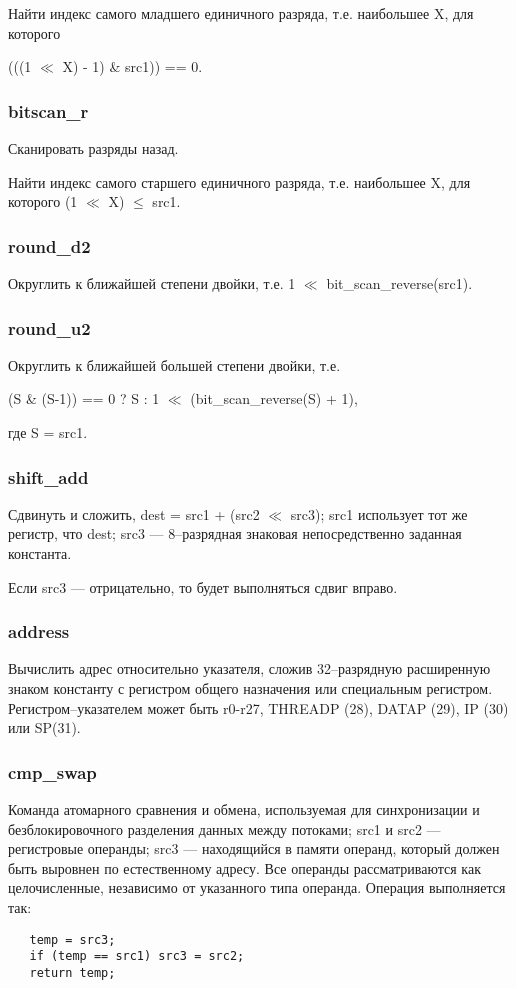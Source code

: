 \documentclass[forwardcom.tex]{subfiles}
\begin{document}
Найти индекс самого младшего единичного разряда, т.е. наибольшее  X, для которого

(((1 $\ll$ X) - 1) \& src1)) == 0.

\subsubsection{bitscan\_r}
Сканировать разряды назад.

Найти индекс самого старшего единичного разряда, т.е. наибольшее  X, для которого (1 $\ll$ X) $\leq$ src1.

\subsubsection{round\_d2}
Округлить к ближайшей степени двойки, т.е. 1 $\ll$ bit\_scan\_reverse(src1).

\subsubsection{round\_u2}
Округлить к ближайшей большей степени двойки, т.е.

(S \& (S-1)) == 0 ? S : 1 $\ll$  (bit\_scan\_reverse(S) + 1),

где S = src1.

\subsubsection{shift\_add}
Сдвинуть и сложить, dest = src1 + (src2 $\ll$  src3); src1 использует тот же регистр, что dest; src3 --- 8--разрядная знаковая непосредственно заданная константа.

Если src3 --- отрицательно, то будет выполняться сдвиг вправо.

\subsubsection{address}
Вычислить адрес относительно указателя, сложив 32--разрядную расширенную знаком константу с регистром общего назначения или специальным регистром. Регистром--указателем может быть r0-r27, THREADP (28), DATAP (29), IP (30) или SP(31).

\subsubsection{cmp\_swap}
Команда атомарного сравнения и обмена, используемая для синхронизации и безблокировочного разделения данных между потоками; src1 и src2 --- регистровые операнды; src3 --- находящийся в памяти операнд, который должен быть выровнен по естественному адресу. Все операнды рассматриваются как целочисленные, независимо от указанного типа операнда. Операция выполняется так:
\begin{verbatim}
   temp = src3;
   if (temp == src1) src3 = src2;
   return temp;
\end{verbatim}
\end{document}
